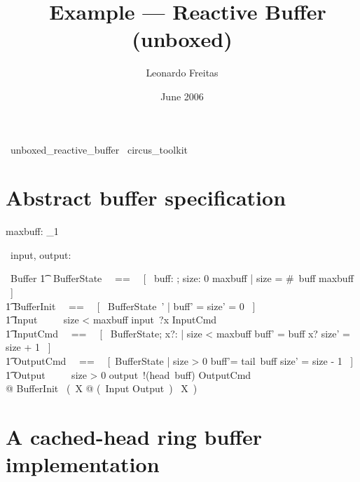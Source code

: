 \documentclass{article}
\begin{document}
\title{\Circus\ Example --- Reactive Buffer (unboxed)}
\author{Leonardo Freitas}
\date{June 2006}

\maketitle

\begin{zsection}
  \SECTION\ unboxed\_reactive\_buffer \parents\ circus\_toolkit
\end{zsection}

\section{Abstract buffer specification}

\begin{axdef}
  maxbuff: \nat_1
\end{axdef}

\begin{zed}
  \circchannel\ input, output: \nat
\end{zed}

\begin{circus}
  \circprocess\ Buffer \circdef \circbegin
  \also %
    \t1 \circstate\ BufferState ~~==~~ [~ buff: \seq \nat; size: 0 \upto maxbuff | size = \#~buff \leq maxbuff ~] \\ %
    \t1 BufferInit ~~==~~ [~ BufferState~' | buff' = \langle\rangle \land size' = 0 ~] \\
    \t1 Input ~~\circdef~~ \lcircguard size < maxbuff \rcircguard \circguard input~?x \then InputCmd \\
    \t1 InputCmd ~~==~~ [~ \Delta BufferState; x?: \nat | size < maxbuff \land buff' = buff \cat \langle x? \rangle \land size' = size + 1 ~] \\
    \t1 OutputCmd ~~==~~ [~\Delta BufferState | size > 0 \land buff'= tail~buff \land size' = size - 1 ~] \\
    \t1 Output ~~\circdef~~ \lcircguard size > 0 \rcircguard \circguard output~!(head~buff) \then OutputCmd \\
  @ BufferInit \circseq\ (~\circmu X @ (~Input \extchoice Output~) \circseq\ X~) \\
  \circend
\end{circus}


\section{A cached-head ring buffer implementation}
\end{document}

